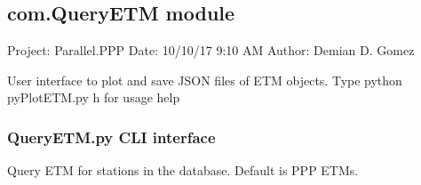 \documentclass[letterpaper,10pt,english]{sphinxmanual}
\begin{document}
\subsection{com.QueryETM module}
\label{\detokenize{com:module-com.QueryETM}}\label{\detokenize{com:com-queryetm-module}}
\sphinxAtStartPar
Project: Parallel.PPP
Date: 10/10/17 9:10 AM
Author: Demian D. Gomez

\sphinxAtStartPar
User interface to plot and save JSON files of ETM objects.
Type python pyPlotETM.py \sphinxhyphen{}h for usage help

\begin{fulllineitems}
\label{\detokenize{com:com.QueryETM.from_file}}
\pysigstartsignatures
{}
\pysigstopsignatures
\end{fulllineitems}


\begin{fulllineitems}
\label{\detokenize{com:com.QueryETM.main}}
\pysigstartsignatures
{}
\pysigstopsignatures
\end{fulllineitems}



\subsubsection{QueryETM.py \sphinxhyphen{} CLI interface}
\label{\detokenize{com:QueryETM.py---CLI-interface}}
\sphinxAtStartPar
Query ETM for stations in the database. Default is PPP ETMs.
\end{document}

